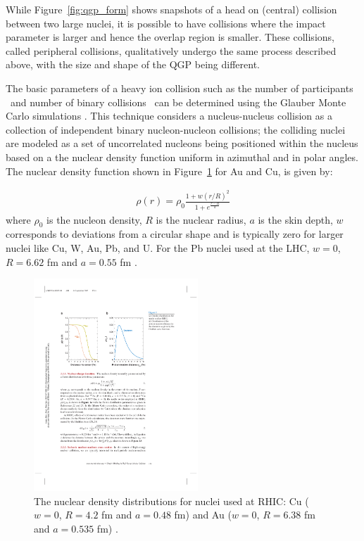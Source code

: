 While Figure~\ref{fig:qgp_form} shows snapshots of a head on (central) collision between two large nuclei, it is possible to have collisions where the impact parameter is larger and hence the overlap region is smaller. These collisions, called peripheral collisions, qualitatively undergo the same process described above, with the size and shape of the QGP being different.

The basic parameters of a heavy ion collision such as the number of participants \Npart\ and number of binary collisions \Ncoll\ can be determined using the Glauber Monte Carlo simulations \cite{glauberArticle, glauberMisc}. This technique considers a nucleus-nucleus collision as a collection of independent binary nucleon-nucleon collisions; the colliding nuclei are modeled as a set of uncorrelated nucleons being positioned within the nucleus based on a the nuclear density function uniform in azimuthal and in polar angles. The nuclear density function shown in Figure~\ref{fig:nuclearDensity} for Au and Cu, is given by:

\begin{align}
\rho(r) = \rho_0 \frac{1 + w (r/R)^2}{1+e^{\frac{r-R}{a}}}
\end{align}
where $\rho_0$ is the nucleon density, $R$ is the nuclear radius, $a$ is the skin depth, $w$ corresponds to deviations from a circular shape and is typically zero for larger nuclei like Cu, W, Au, Pb, and U. For the Pb nuclei used at the LHC, $w = 0$, $R = 6.62$ fm and $a =0.55$ fm \cite{DEVRIES1987495}. 

\begin{figure}[htbp]
\begin{center}
\includegraphics[width=0.55\textwidth]{figures/theory/nuclearDensity}
\caption{ The nuclear density distributions for nuclei used at RHIC: Cu ($w = 0$, $R = 4.2$ fm and $a =0.48$ fm)  and Au ($w = 0$, $R = 6.38$ fm and $a =0.535$ fm) \cite{doi:10.1146/annurev.nucl.57.090506.123020, DEVRIES1987495}.}
\label{fig:nuclearDensity}
\end{center}
\end{figure}

